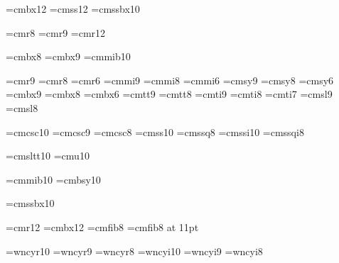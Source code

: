 
\font\bigbold=cmbx12
\font\bigsans=cmss12
\font\smallheader=cmssbx10 %

\font\eightpt=cmr8
\font\ninept=cmr9
\font\twelvept=cmr12

\font\eightbold=cmbx8
\font\ninebold=cmbx9
\font\mathbold=cmmib10

\font\ninerm=cmr9     \font\eightrm=cmr8   \font\sixrm=cmr6      %
\font\ninei=cmmi9     \font\eighti=cmmi8   \font\sixi=cmmi6      %
\font\ninesy=cmsy9    \font\eightsy=cmsy8  \font\sixsy=cmsy6     %
\font\ninebf=cmbx9    \font\eightbf=cmbx8  \font\sixbf=cmbx6     %
\font\ninett=cmtt9    \font\eighttt=cmtt8                        %
\font\nineit=cmti9    \font\eightit=cmti8  \font\sevenit=cmti7   %
\font\ninesl=cmsl9    \font\eightsl=cmsl8                        %

\font\tensc=cmcsc10   \font\ninesc=cmcsc9  \font\eightsc=cmcsc8  %
\font\tenss=cmss10    \font\eightss=cmssq8    %
\font\tenssi=cmssi10  \font\eightssi=cmssqi8  %

\font\tensltt=cmsltt10 %
\font\tenu=cmu10       %

\font\tenbi=cmmib10    %
\font\tenbsy=cmbsy10   %

\font\tenssbx=cmssbx10 %

\font\twelverm=cmr12  \font\twelvebf=cmbx12
\font\eightfib=cmfib8  \font\elevenfib=cmfib8 at 11pt
\def\sc{\tensc}  \def\mc{\ninerm}


    \font\tencyr=wncyr10   \font\ninecyr=wncyr9   \font\eightcyr=wncyr8
    \font\tencyri=wncyi10  \font\ninecyri=wncyi9  \font\eightcyri=wncyi8
    \def\cyr{\tencyr\cyracc} \def\cyri{\tencyri\cyracc}

